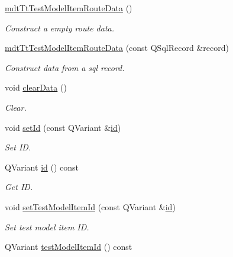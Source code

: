 \begin{DoxyCompactItemize}
\item 
\hyperlink{classmdt_tt_test_model_item_route_data_a59a0b076edb84891df37a6db40962f44}{mdt\-Tt\-Test\-Model\-Item\-Route\-Data} ()
\begin{DoxyCompactList}\small\item\em Construct a empty route data. \end{DoxyCompactList}\item 
\hyperlink{classmdt_tt_test_model_item_route_data_a048bc0a97bbcd91a23e5fd9aad63c36c}{mdt\-Tt\-Test\-Model\-Item\-Route\-Data} (const Q\-Sql\-Record \&record)
\begin{DoxyCompactList}\small\item\em Construct data from a sql record. \end{DoxyCompactList}\item 
void \hyperlink{classmdt_tt_test_model_item_route_data_a2d247da5bc9d377d5dafbb1080d65be6}{clear\-Data} ()
\begin{DoxyCompactList}\small\item\em Clear. \end{DoxyCompactList}\item 
void \hyperlink{classmdt_tt_test_model_item_route_data_a40e5fe46e70a9a7ffc2e5f3d8171b679}{set\-Id} (const Q\-Variant \&\hyperlink{classmdt_tt_test_model_item_route_data_ad34638a6361e64a867f30821b73ff385}{id})
\begin{DoxyCompactList}\small\item\em Set I\-D. \end{DoxyCompactList}\item 
Q\-Variant \hyperlink{classmdt_tt_test_model_item_route_data_ad34638a6361e64a867f30821b73ff385}{id} () const 
\begin{DoxyCompactList}\small\item\em Get I\-D. \end{DoxyCompactList}\item 
void \hyperlink{classmdt_tt_test_model_item_route_data_a2180aaa63197ce3540638e256ae2acb6}{set\-Test\-Model\-Item\-Id} (const Q\-Variant \&\hyperlink{classmdt_tt_test_model_item_route_data_ad34638a6361e64a867f30821b73ff385}{id})
\begin{DoxyCompactList}\small\item\em Set test model item I\-D. \end{DoxyCompactList}\item 
Q\-Variant \hyperlink{classmdt_tt_test_model_item_route_data_aad243db97f2cea833fd2ff61c98ec0df}{test\-Model\-Item\-Id} () const 

\end{DoxyCompactItemize}
